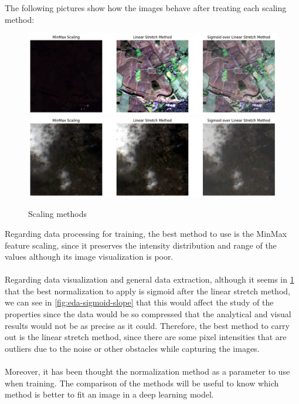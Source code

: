 \documentclass[11pt, a4paper]{article}
\begin{document}
	The following pictures show how the images behave after treating each scaling method:
	\begin{figure}[H]
		\centering
		\includegraphics[width=15cm]{imgs/eda/scaled-methods-1}\\
		\includegraphics[width=15cm]{imgs/eda/scaled-methods-2}
		\caption{Scaling methods}
		\label{fig:scaling-methods}
	\end{figure}
	Regarding data processing for training, the best method to use is the MinMax feature scaling, since it preserves the intensity distribution and range of the values although its image visualization is poor.
	\\
	\\
	Regarding data visualization and general data extraction, although it seems in \ref{fig:scaling-methods} that the best normalization to apply is sigmoid after the linear stretch method, we can see in \ref{fig:eda-sigmoid-slope} that this would affect the study of the properties since the data would be so compressed that the analytical and visual results would not be as precise as it could. Therefore, the best method to carry out is the linear stretch method, since there are some pixel intensities that are outliers due to the noise or other obstacles while capturing the images.
	\\
	\\
	Moreover, it has been thought the normalization method as a parameter to use when training. The comparison of the methods will be useful to know which method is better to fit an image in a deep learning model.
\end{document}
